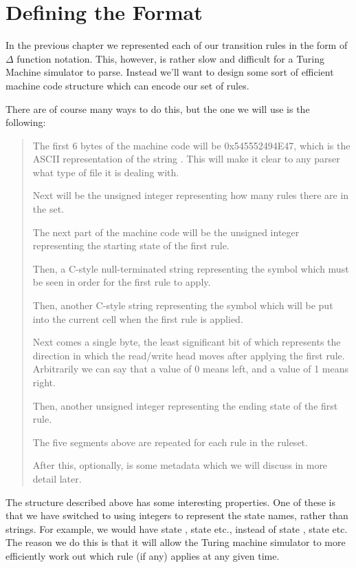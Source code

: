 \section{Defining the Format}

In the previous chapter we represented each of our transition rules in the form of $\Delta$ function notation. This, however, is rather slow and difficult for a Turing Machine simulator to parse. Instead we'll want to design some sort of efficient machine code structure which can encode our set of rules.

There are of course many ways to do this, but the one we will use is the following:

\begin{quote}
    The first 6 bytes of the machine code will be 0x545552494E47, which is the ASCII representation of the string . This will make it clear to any parser what type of file it is dealing with.
    
    Next will be the unsigned integer representing how many rules there are in the set.
    
    The next part of the machine code will be the unsigned integer representing the starting state of the first rule.
    
    Then, a C-style null-terminated string representing the symbol which must be seen in order for the first rule to apply.
    
    Then, another C-style string representing the symbol which will be put into the current cell when the first rule is applied.
    
    Next comes a single byte, the least significant bit of which represents the direction in which the read/write head moves after applying the first rule. Arbitrarily we can say that a value of 0 means left, and a value of 1 means right.
    
    Then, another unsigned integer representing the ending state of the first rule.
    
    The five segments above are repeated for each rule in the ruleset.
    
    After this, optionally, is some metadata which we will discuss in more detail later.\label{concept:metadata}
\end{quote}

The structure described above has some interesting properties. One of these is that we have switched to using integers to represent the state names, rather than strings. For example, we would have state , state  etc., instead of state , state  etc. The reason we do this is that it will allow the Turing machine simulator to more efficiently work out which rule (if any) applies at any given time.

